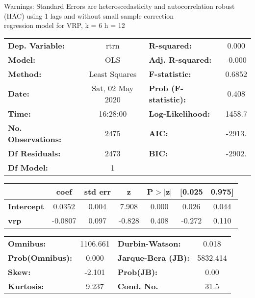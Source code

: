 Warnings: \newline
 [1] Standard Errors are heteroscedasticity and autocorrelation robust (HAC) using 1 lags and without small sample correction\\ 

regression model for VRP, k = 6 h = 12\begin{center}
\begin{tabular}{lclc}
\toprule
\textbf{Dep. Variable:}    &       rtrn       & \textbf{  R-squared:         } &     0.000   \\
\textbf{Model:}            &       OLS        & \textbf{  Adj. R-squared:    } &    -0.000   \\
\textbf{Method:}           &  Least Squares   & \textbf{  F-statistic:       } &    0.6852   \\
\textbf{Date:}             & Sat, 02 May 2020 & \textbf{  Prob (F-statistic):} &    0.408    \\
\textbf{Time:}             &     16:28:00     & \textbf{  Log-Likelihood:    } &    1458.7   \\
\textbf{No. Observations:} &        2475      & \textbf{  AIC:               } &    -2913.   \\
\textbf{Df Residuals:}     &        2473      & \textbf{  BIC:               } &    -2902.   \\
\textbf{Df Model:}         &           1      & \textbf{                     } &             \\
\bottomrule
\end{tabular}
\begin{tabular}{lcccccc}
                   & \textbf{coef} & \textbf{std err} & \textbf{z} & \textbf{P$> |$z$|$} & \textbf{[0.025} & \textbf{0.975]}  \\
\midrule
\textbf{Intercept} &       0.0352  &        0.004     &     7.908  &         0.000        &        0.026    &        0.044     \\
\textbf{vrp}       &      -0.0807  &        0.097     &    -0.828  &         0.408        &       -0.272    &        0.110     \\
\bottomrule
\end{tabular}
\begin{tabular}{lclc}
\textbf{Omnibus:}       & 1106.661 & \textbf{  Durbin-Watson:     } &    0.018  \\
\textbf{Prob(Omnibus):} &   0.000  & \textbf{  Jarque-Bera (JB):  } & 5832.414  \\
\textbf{Skew:}          &  -2.101  & \textbf{  Prob(JB):          } &     0.00  \\
\textbf{Kurtosis:}      &   9.237  & \textbf{  Cond. No.          } &     31.5  \\
\bottomrule
\end{tabular}
\end{center}


